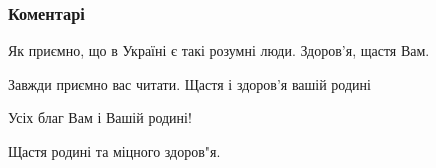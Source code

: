  
 
 
 
 
\subsubsection{Коментарі}

\begin{itemize}
 
Як приємно, що в Україні є такі розумні люди. Здоров'я, щастя Вам.

 
Завжди приємно вас читати. Щастя і здоров'я вашій родині


 
Усіх благ Вам і Вашій родині!

 
Щастя родині та міцного здоров"я.

 

\end{itemize}

